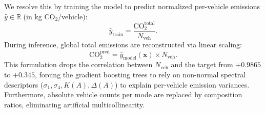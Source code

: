 \documentclass[lettersize,journal]{IEEEtran}
\begin{document}
We resolve this by training the model to predict normalized per-vehicle emissions $\hat{y} \in \mathbb{R}$ (in kg $\text{CO}_2$/vehicle):
\begin{equation}
\hat{y}_{\text{train}} = \frac{\text{CO}_2^{\text{total}}}{N_{\text{veh}}}.
\end{equation}
During inference, global total emissions are reconstructed via linear scaling:
\begin{equation}
\text{CO}_2^{\text{pred}} = \hat{y}_{\text{model}}(\mathbf{x}) \times N_{\text{veh}}.
\end{equation}
This formulation drops the correlation between $N_{\text{veh}}$ and the target from $+0.9865$ to $+0.345$, forcing the gradient boosting trees to rely on non-normal spectral descriptors ($\sigma_1, \sigma_4, K(A), \Delta(A)$) to explain per-vehicle emission variances. Furthermore, absolute vehicle counts per mode are replaced by composition ratios, eliminating artificial multicollinearity.
\end{document}
